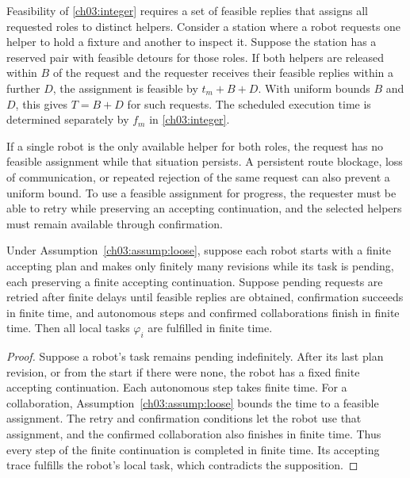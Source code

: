 \begin{revision}
Feasibility of \eqref{ch03:integer} requires a set of feasible replies that
assigns all requested roles to distinct helpers. Consider a station where
a robot requests one helper to hold a fixture and another to inspect it.
Suppose the station has a reserved pair with feasible detours for those roles.
If both helpers are released within $B$ of the request and the requester
receives their feasible replies within a further $D$, the assignment
is feasible by $t_m+B+D$. With uniform bounds $B$ and $D$, this gives
$T=B+D$ for such requests. The scheduled execution time is determined
separately by $f_m$ in \eqref{ch03:integer}.

If a single robot is the only available helper for both roles, the request
has no feasible assignment while that situation persists. A persistent route
blockage, loss of communication, or repeated rejection of the same request
can also prevent a uniform bound. To use a feasible assignment for progress,
the requester must be able to retry while preserving an accepting continuation,
and the selected helpers must remain available through confirmation.
\end{revision}

\begin{revision}
\begin{theorem}
\label{ch03:all}
Under Assumption~\ref{ch03:assump:loose}, suppose each robot starts with a
finite accepting plan and makes only finitely many revisions while its task
is pending, each preserving a finite accepting continuation. Suppose pending
requests are retried after finite delays until feasible replies are obtained,
confirmation succeeds in finite time, and autonomous steps and confirmed
collaborations finish in finite time. Then all local tasks
$\varphi_i$ are fulfilled in finite time.
\end{theorem}

\begin{proof}
Suppose a robot's task remains pending indefinitely. After its last plan
revision, or from the start if there were none, the robot has a fixed finite
accepting continuation. Each autonomous step takes finite time. For a
collaboration, Assumption~\ref{ch03:assump:loose} bounds the time to a
feasible assignment. The retry and confirmation conditions let the robot
use that assignment, and the confirmed collaboration also finishes in
finite time. Thus every step of the finite continuation is completed in
finite time. Its accepting trace fulfills the robot's local task, which
contradicts the supposition.
\end{proof}
\end{revision}
